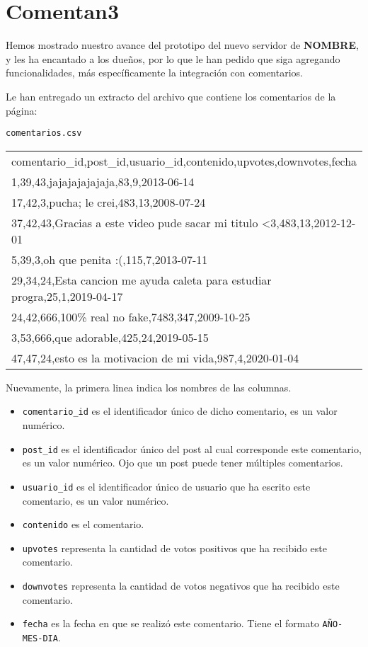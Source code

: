\section{Comentan3}

Hemos mostrado nuestro avance del prototipo del nuevo servidor de \textbf{NOMBRE}, y les ha encantado a los dueños, por lo que le han pedido que siga agregando funcionalidades, más específicamente la integración con comentarios.

Le han entregado un extracto del archivo que contiene los comentarios de la página:
\begin{center}
    \texttt{comentarios.csv} \\
	\begin{tabular}{|l|}
		\hline
comentario\_id,post\_id,usuario\_id,contenido,upvotes,downvotes,fecha\\
1,39,43,jajajajajajaja,83,9,2013-06-14\\
17,42,3,pucha; le crei,483,13,2008-07-24\\
37,42,43,Gracias a este video pude sacar mi titulo <3,483,13,2012-12-01\\
5,39,3,oh que penita :(,115,7,2013-07-11\\
29,34,24,Esta cancion me ayuda caleta para estudiar progra,25,1,2019-04-17\\
24,42,666,100\% real no fake,7483,347,2009-10-25\\
3,53,666,que adorable,425,24,2019-05-15\\
47,47,24,esto es la motivacion de mi vida,987,4,2020-01-04\\
		\hline
	\end{tabular}
\end{center}

Nuevamente, la primera linea indica los nombres de las columnas.

\begin{itemize}
\itemsep0em 
    \item \texttt{comentario\_id} es el identificador único de dicho comentario, es un valor numérico.
    \item \texttt{post\_id} es el identificador único del post al cual corresponde este comentario, es un valor numérico. Ojo que un post puede tener múltiples comentarios.
    \item \texttt{usuario\_id} es el identificador único de usuario que ha escrito este comentario, es un valor numérico.
    \item \texttt{contenido} es el comentario.
    \item \texttt{upvotes} representa la cantidad de votos positivos que ha recibido este comentario.
    \item \texttt{downvotes} representa la cantidad de votos negativos que ha recibido este comentario.
    \item \texttt{fecha} es la fecha en que se realizó este comentario. Tiene el formato \texttt{AÑO-MES-DIA}.
\end{itemize}

